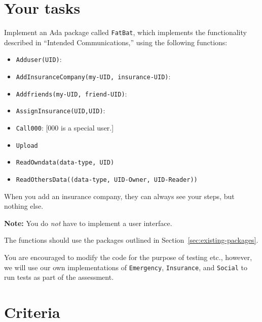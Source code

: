 \documentclass[11pt]{article}
\begin{document}
\section{Your tasks}

 Implement an Ada package called \texttt{FatBat}, which implements the functionality described in ``Intended Communications,'' using the following functions:
\begin{itemize}
\item \texttt{Adduser(UID)}: 
\item \texttt{AddInsuranceCompany(my-UID, insurance-UID)}:
\item \texttt{Addfriends(my-UID, friend-UID)}:
\item \texttt{AssignInsurance(UID,UID)}:
\item \texttt{Call000}:  [000 is a special user.]
\item \texttt{Upload}
\item \texttt{ReadOwndata(data-type, UID)}
\item \texttt{ReadOthersData((data-type, UID-Owner, UID-Reader))}
\end{itemize}

When you add an insurance company, they can always see your steps, but nothing else.


 \textbf{Note:} You do \emph{not} have to implement a user interface.

  The functions should use the packages outlined in Section~\ref{sec:existing-packages}.

You are encouraged to modify the code for the purpose of testing etc., however, we will use our own implementations of \texttt{Emergency}, \texttt{Insurance}, and \texttt{Social} to run tests as part of the assessment.

\section{Criteria}
\end{document}
